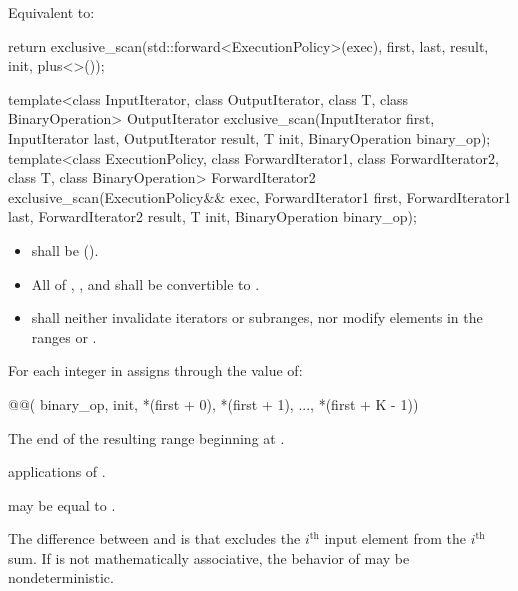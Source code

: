 \begin{itemdescr}
\pnum
\effects
Equivalent to:
\begin{codeblock}
return exclusive_scan(std::forward<ExecutionPolicy>(exec),
                      first, last, result, init, plus<>());
\end{codeblock}
\end{itemdescr}

%
\begin{itemdecl}
template<class InputIterator, class OutputIterator, class T, class BinaryOperation>
  OutputIterator exclusive_scan(InputIterator first, InputIterator last,
                                OutputIterator result, T init, BinaryOperation binary_op);
template<class ExecutionPolicy,
         class ForwardIterator1, class ForwardIterator2, class T, class BinaryOperation>
  ForwardIterator2 exclusive_scan(ExecutionPolicy&& exec,
                                  ForwardIterator1 first, ForwardIterator1 last,
                                  ForwardIterator2 result, T init, BinaryOperation binary_op);
\end{itemdecl}

\begin{itemdescr}
\pnum
\requires
\begin{itemize}
\item
   shall be  ().
\item
  All of
  ,
  ,
  and 
  shall be convertible to .
\item
   shall neither invalidate iterators or subranges,
  nor modify elements in
  the ranges  or .
\end{itemize}

\pnum
\effects
For each integer  in 
assigns through  the value of:
\begin{codeblock}
@@(
    binary_op, init, *(first + 0), *(first + 1), ..., *(first + K - 1))
\end{codeblock}

\pnum
\returns
The end of the resulting range beginning at .

\pnum
\complexity
{} applications of .

\pnum
\remarks
{} may be equal to .

\pnum
\begin{note}
The difference between  and  is
that  excludes the $i^\text{th}$ input element
from the $i^\text{th}$ sum.
If  is not mathematically associative,
the behavior of  may be nondeterministic.
\end{note}
\end{itemdescr}

